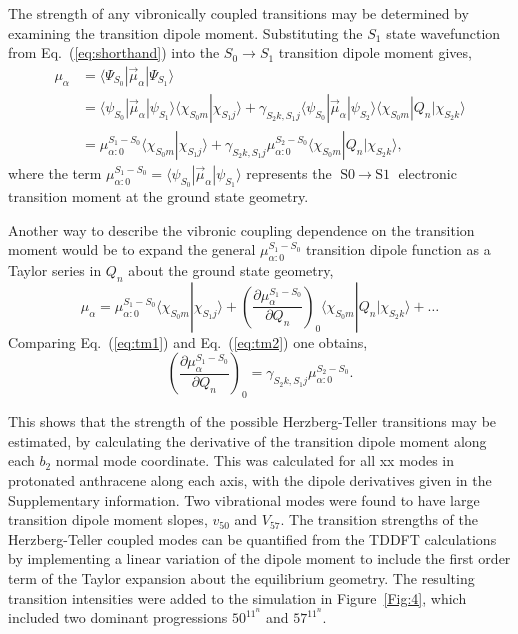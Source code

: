 \documentclass[journal=jpcafh,manuscript=article,layout=onecolumn, 12pt]{achemso}
\begin{document}
The strength of any vibronically coupled transitions may be determined by examining the
transition dipole moment. Substituting the $S_1$ state wavefunction from Eq.~(\ref{eq:shorthand}) into the $S_0\rightarrow S_1$ transition dipole moment gives,
\begin{align}
\mu_{\alpha}&=\langle\Psi_{S_0}|\vec{\mu}_{\alpha}|\Psi_{S_1}\rangle\\
&=\langle\psi_{S_0}|\vec{\mu}_{\alpha}|\psi_{S_1}\rangle\langle\chi_{S_0m}|\chi_{S_1j}\rangle +
\gamma_{S_2k,S_1j}\langle\psi_{S_0}|\vec{\mu}_{\alpha}|\psi_{S_2}\rangle\langle\chi_{S_0m}|Q_n|\chi_{S_2k}\rangle\\
&=\mu_{\alpha:0}^{S_1-S_0}\langle\chi_{S_0m}|\chi_{S_1j}\rangle + \gamma_{S_2k,S_1j}\mu_{\alpha:0}^{S_2-S_0}\langle\chi_{S_0m}|Q_n|\chi_{S_2k}\rangle,
\end{align}
where the term $\mu_{\alpha:0}^{S_1-S_0}= \langle\psi_{S_0}|\vec{\mu}_{\alpha}|\psi_{S_1}\rangle$ represents the $\text{S0}~\rightarrow~\text{S1}$ electronic transition moment at the ground state geometry.

Another way to describe the vibronic coupling dependence on the transition moment would be to expand the general $\mu_{\alpha:0}^{S_1-S_0}$ transition dipole function as a Taylor series in $Q_n$ about the ground state geometry,
\begin{equation}
\mu_{\alpha} = \mu_{\alpha:0}^{S_1-S_0}\langle\chi_{S_0m}|\chi_{S_1j}\rangle + \left(\frac{\partial\mu_{\alpha}^{S_1-S_0}}{\partial Q_n}\right)_0 \langle\chi_{S_0m}|Q_n|\chi_{S_2k}\rangle + \dots 
\label{eq:tm2}
\end{equation} 
Comparing Eq.~(\ref{eq:tm1}) and Eq.~(\ref{eq:tm2}) one obtains,
\begin{equation}
\left(\frac{\partial\mu_{\alpha}^{S_1-S_0}}{\partial Q_n}\right)_0 = \gamma_{S_2k,S_1j}\mu_{\alpha:0}^{S_2-S_0}.
\label{eq:tm3}
\end{equation}

This shows that the strength of the possible Herzberg-Teller transitions may be estimated, by calculating the derivative of the transition dipole moment along each $b_2$ normal mode coordinate. This was calculated for all xx modes in protonated anthracene along each axis, with the dipole derivatives given in the Supplementary information. Two vibrational modes were found to have large transition dipole moment slopes, $v_{50}$ and $V_{57}$. The transition strengths of the Herzberg-Teller coupled modes can be quantified from the TDDFT calculations by implementing a linear variation of the dipole moment to include the first order term of the Taylor expansion about the equilibrium geometry. The resulting transition intensities were added to the simulation in Figure~\ref{Fig:4}, which included two dominant progressions $50^11^n$ and $57^11^n$. 
\end{document}
